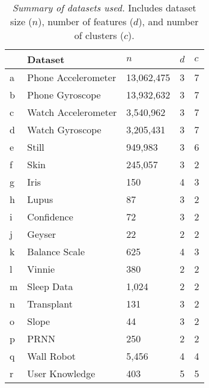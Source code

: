 
\begin{table}
\begin{tabular}{ |p{0.1cm}||p{3.5cm}|p{1.5cm}|p{0.3cm}|p{0.3cm}| }
        \hline
        & \textbf{Dataset} & $n$ & $d$ & $c$ \\
        \hline
        a & Phone Accelerometer & 13,062,475 & 3 & 7 \\
        \hline
        b & Phone Gyroscope & 13,932,632 & 3 & 7 \\
        \hline
        c & Watch Accelerometer & 3,540,962 & 3 & 7 \\
        \hline
        d & Watch Gyroscope & 3,205,431 & 3 & 7 \\
        \hline
        e & Still & 949,983 & 3 & 6 \\
        \hline
        f & Skin & 245,057 & 3 & 2 \\
        \hline
        g & Iris & 150 & 4 & 3 \\
        \hline
        h & Lupus & 87 & 3 & 2 \\
        \hline
        i & Confidence & 72 & 3 & 2 \\
        \hline
        j & Geyser & 22 & 2 & 2 \\
        \hline
        k & Balance Scale & 625 & 4 & 3 \\
        \hline
        l & Vinnie & 380 & 2 & 2 \\
        \hline
        m & Sleep Data & 1,024 & 2 & 2 \\
        \hline
        n & Transplant & 131 & 3 & 2 \\
        \hline
        o & Slope & 44 & 3 & 2 \\
        \hline
        p & PRNN & 250 & 2 & 2 \\
        \hline
        q & Wall Robot & 5,456 & 4 & 4 \\
        \hline
        r & User Knowledge & 403 & 5 & 5 \\
        \hline
    \end{tabular}
    \vspace{0.3cm}
    \caption{\label{fig:datasetsummary_small}\textit{Summary of datasets used.} Includes dataset size ($n$), number of features ($d$), and number of clusters ($c$).}
\end{table}

